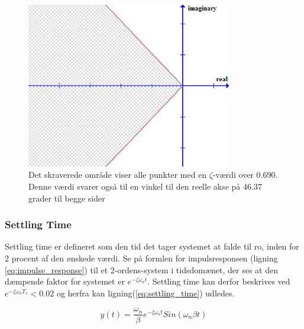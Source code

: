 \begin{figure}[ht]
	\begin{center}
		\includegraphics[width=0.8\textwidth]{Billeder/Overshoot.PNG}
	\end{center}
\caption{Det skraverede område viser alle punkter med en $\zeta$-værdi over 0.690. Denne værdi svarer også til en vinkel til den reelle akse på 46.37 grader til begge sider}
\label{fig:Overshoot}
\end{figure}

\subsubsection{Settling Time}

Settling time er defineret som den tid det tager systemet at falde til ro, inden for 2 procent af den ønskede værdi. Se på formlen for impulsresponsen (ligning \ref{eq:impulse_response}) til et 2-ordens-system i tidsdomænet, der ses at den dæmpende faktor for systemet er $e^{-\zeta\omega_{n}t}$. Settling time kan derfor beskrives ved $e^{-\zeta\omega_{n}T_{s}}<0.02$ og herfra kan ligning(\ref{eq:settling_time}) udledes.

\begin{equation}\label{eq:impulse_response}
y(t)=\frac{\omega_{n}}{\beta}e^{-\zeta\omega_{n}t}Sin(\omega_{n}\beta t)
\end{equation}

